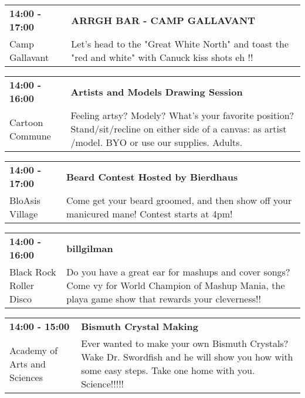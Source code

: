 \begin{tabular}{ p{1in} p{2.2in} }
    \textbf{14:00 - 17:00} & \textbf{ARRGH BAR - CAMP GALLAVANT} \\
    Camp Gallavant \newline  & Let's head to the "Great White North" and toast the "red and white" with Canuck kiss shots eh !! \\
    \hline 
\end{tabular}
    
\begin{tabular}{ p{1in} p{2.2in} }
    \textbf{14:00 - 16:00} & \textbf{Artists and Models Drawing Session} \\
    Cartoon Commune \newline  & Feeling artsy? Modely? What's your favorite position? Stand/sit/recline on either side of a canvas: as artist /model. BYO or use our supplies. Adults. \\
    \hline 
\end{tabular}
    
\begin{tabular}{ p{1in} p{2.2in} }
    \textbf{14:00 - 17:00} & \textbf{Beard Contest Hosted by Bierdhaus} \\
    BloAsis Village \newline  & Come get your beard groomed, and then show off your manicured mane! Contest starts at 4pm! \\
    \hline 
\end{tabular}
    
\begin{tabular}{ p{1in} p{2.2in} }
    \textbf{14:00 - 16:00} & \textbf{billgilman} \\
    Black Rock Roller Disco \newline  & Do you have a great ear for mashups and cover songs? Come vy for World Champion of Mashup Mania, the playa game show that rewards your cleverness!! \\
    \hline 
\end{tabular}
    
\begin{tabular}{ p{1in} p{2.2in} }
    \textbf{14:00 - 15:00} & \textbf{Bismuth Crystal Making} \\
    Academy of Arts and Sciences \newline  & Ever wanted to make your own Bismuth Crystals?  Wake Dr. Swordfish and he will show you how with some easy steps. Take one home with you. Science!!!!! \\
    \hline 
\end{tabular}
    
